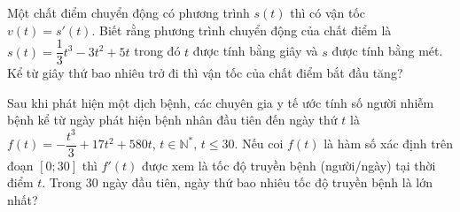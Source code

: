 \begin{ex}%
	Một chất điểm chuyển động có phương trình $s(t)$ thì có vận tốc $v(t)=s'(t)$. Biết rằng phương trình chuyển động của chất điểm là $s(t)=\dfrac{1}{3}t^3-3t^2+5t$ trong đó $t$ được tính bằng giây và $s$ được tính bằng mét. Kể từ giây thứ bao nhiêu trở đi thì vận tốc của chất điểm bắt đầu tăng?
\end{ex}

\begin{ex}%
	Sau khi phát hiện một dịch bệnh, các chuyên gia y tế ước tính số người nhiễm bệnh kể từ ngày phát hiện bệnh nhân đầu tiên đến ngày thứ $t$ là $f(t)=-\dfrac{t^3}{3}+17t^2+580t$, $t\in \mathbb{N}^*$, $t\leq 30$. Nếu coi $f(t)$ là hàm số xác định trên đoạn $[0;30]$ thì $f'(t)$ được xem là tốc độ truyền bệnh (người/ngày) tại thời điểm $t$. Trong $30$ ngày đầu tiên, ngày thứ bao nhiêu tốc độ truyền bệnh là lớn nhất?
\end{ex}

